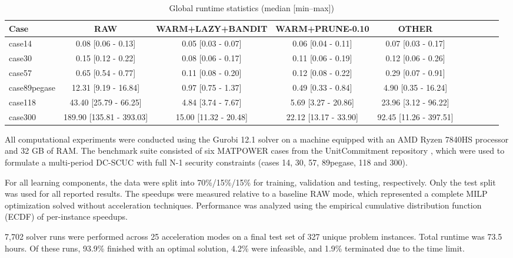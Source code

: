 \documentclass{ieeeaccess}
\begin{document}
\begin{table}
\label{tab:runtime}
\renewcommand{\arraystretch}{1.2}
\footnotesize
\caption{Global runtime statistics (median [min--max])}
\begin{tabular}{|l||c|c|c|c|c|c|c|c|c|}\hline
\textbf{Case} & \textbf{RAW} & \textbf{WARM+LAZY+BANDIT} & \textbf{WARM+PRUNE-0.10} & \textbf{OTHER} \\ \hline \hline
case14 & 0.08 [0.06 - 0.13] & 0.05 [0.03 - 0.07] & 0.06 [0.04 - 0.11] & 0.07 [0.03 - 0.17] \\ \hline
case30 & 0.15 [0.12 - 0.22] & 0.08 [0.06 - 0.17] & 0.11 [0.06 - 0.19] & 0.12 [0.06 - 0.26] \\ \hline
case57 & 0.65 [0.54 - 0.77] & 0.11 [0.08 - 0.20] & 0.12 [0.08 - 0.22] & 0.29 [0.07 - 0.91] \\ \hline
case89pegase & 12.31 [9.19 - 16.84] & 0.97 [0.75 - 1.37] & 0.49 [0.33 - 0.84] & 4.90 [0.35 - 16.24] \\ \hline
case118 & 43.40 [25.79 - 66.25] & 4.84 [3.74 - 7.67] & 5.69 [3.27 - 20.86] & 23.96 [3.12 - 96.22] \\ \hline
case300 & 189.90 [135.81 - 393.03] & 15.00 [11.32 - 20.48] & 22.12 [13.17 - 33.90] & 92.45 [11.26 - 397.51] \\ \hline
\end{tabular}
\end{table}

All computational experiments were conducted using the Gurobi 12.1 solver on a machine equipped with an AMD Ryzen 7840HS processor and 32 GB of RAM. The benchmark suite consisted of six MATPOWER cases from the UnitCommitment repository \cite{Xavier2024}, which were used to formulate a multi-period DC-SCUC with full N-1 security constraints (cases 14, 30, 57, 89pegase, 118 and 300).

For all learning components, the data were split into 70\%/15\%/15\% for training, validation and testing, respectively. Only the test split was used for all reported results. The speedups were measured relative to a baseline RAW mode, which represented a complete MILP optimization solved without acceleration techniques. Performance was analyzed using the empirical cumulative distribution function (ECDF) of per-instance speedups.


7,702 solver runs were performed across 25 acceleration modes on a final test set of 327 unique problem instances. Total runtime was 73.5 hours. Of these runs, 93.9\% finished with an optimal solution, 4.2\% were infeasible, and 1.9\% terminated due to the time limit.
\end{document}
